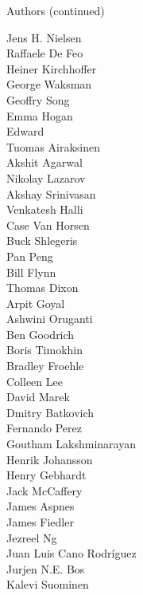 \documentclass[xcolor=svgnames]{beamer}
\begin{document}
  \begin{frame}{Authors (continued)}
    \begin{multicols}{5}
      \tiny

          Jens H. Nielsen\\
          Raffaele De Feo\\
          Heiner Kirchhoffer\\
          George Waksman\\
          Geoffry Song\\
          Emma Hogan\\
          Edward\\
          Tuomas Airaksinen\\
          Akshit Agarwal\\
          Nikolay Lazarov\\
          Akshay Srinivasan\\
          Venkatesh Halli\\
          Case Van Horsen\\
          Buck Shlegeris\\
          Pan Peng\\
          Bill Flynn\\
          Thomas Dixon\\
          Arpit Goyal\\
          Ashwini Oruganti\\
          Ben Goodrich\\
          Boris Timokhin\\
          Bradley Froehle\\
          Colleen Lee\\
          David Marek\\
          Dmitry Batkovich\\
          Fernando Perez\\
          Goutham Lakshminarayan\\
          Henrik Johansson\\
          Henry Gebhardt\\
          Jack McCaffery\\
          James Aspnes\\
          James Fiedler\\
          Jezreel Ng\\
          Juan Luis Cano Rodríguez\\
          Jurjen N.E. Bos\\
          Kalevi Suominen\\

\end{multicols}
\end{frame}
\end{document}
